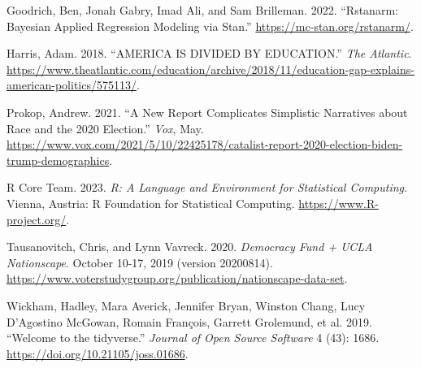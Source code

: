 \documentclass[
  letterpaper,
  DIV=11,
  numbers=noendperiod]{scrartcl}
\newlength{\cslhangindent}
\newlength{\cslentryspacingunit} %
\newenvironment{CSLReferences}[2] %
 {%
  \setlength{\parindent}{0pt}
  \ifodd #1
  \let\oldpar\par
  \def\par{\hangindent=\cslhangindent\oldpar}
  \fi
  \setlength{\parskip}{#2\cslentryspacingunit}
 }%
 {}
\begin{document}
\hypertarget{refs}{}
\begin{CSLReferences}{1}{0}
\leavevmode{}%
Goodrich, Ben, Jonah Gabry, Imad Ali, and Sam Brilleman. 2022.
{``Rstanarm: {Bayesian} Applied Regression Modeling via {Stan}.''}
\url{https://mc-stan.org/rstanarm/}.

\leavevmode{}%
Harris, Adam. 2018. {``AMERICA IS DIVIDED BY EDUCATION.''} \emph{The
Atlantic}.
\url{https://www.theatlantic.com/education/archive/2018/11/education-gap-explains-american-politics/575113/}.

\leavevmode{}%
Prokop, Andrew. 2021. {``A New Report Complicates Simplistic Narratives
about Race and the 2020 Election.''} \emph{Vox}, May.
\url{https://www.vox.com/2021/5/10/22425178/catalist-report-2020-election-biden-trump-demographics}.

\leavevmode{}%
R Core Team. 2023. \emph{R: A Language and Environment for Statistical
Computing}. Vienna, Austria: R Foundation for Statistical Computing.
\url{https://www.R-project.org/}.

\leavevmode{}%
Tausanovitch, Chris, and Lynn Vavreck. 2020. \emph{Democracy Fund + UCLA
Nationscape}. October 10-17, 2019 (version 20200814).
\url{https://www.voterstudygroup.org/publication/nationscape-data-set}.

\leavevmode{}%
Wickham, Hadley, Mara Averick, Jennifer Bryan, Winston Chang, Lucy
D'Agostino McGowan, Romain François, Garrett Grolemund, et al. 2019.
{``Welcome to the {tidyverse}.''} \emph{Journal of Open Source Software}
4 (43): 1686. \url{https://doi.org/10.21105/joss.01686}.

\end{CSLReferences}
\end{document}
